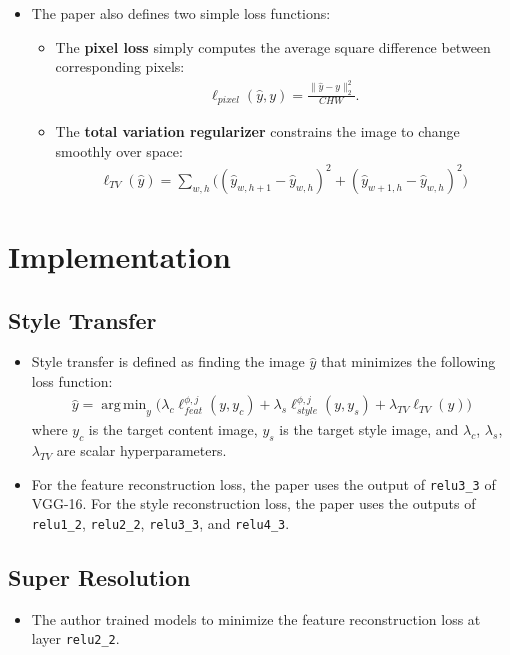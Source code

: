 \documentclass[10pt]{article}
\DeclareMathOperator*{\argmin}{arg\,min}
\begin{document}
\begin{itemize}
    \item The paper also defines two simple loss functions:
    \begin{itemize}
      \item The \textbf{pixel loss} simply computes the average square difference between corresponding pixels:
      \begin{align*}
        \ell_{pixel}(\hat{y}, y) = \frac{\| \hat{y} - y \|_2^2}{CHW}.
      \end{align*}
      \item The \textbf{total variation regularizer} constrains the image to change smoothly over space:
      \begin{align*}
        \ell_{TV}(\hat{y}) = \sum_{w,h} \big( (\hat{y}_{w,h+1} - \hat{y}_{w,h})^2 + (\hat{y}_{w+1,h} - \hat{y}_{w,h})^2 \big)
      \end{align*}
    \end{itemize}
  \end{itemize}

  \section{Implementation}

  \subsection{Style Transfer}

  \begin{itemize}
    \item Style transfer is defined as finding the image $\hat{y}$ that minimizes the following loss function:
    \begin{align*}
      \hat{y} = \argmin_y \big( 
        \lambda_c \ell^{\phi,j}_{feat}(y, y_c)
        + \lambda_s \ell^{\phi,j}_{style}(y, y_s)
        + \lambda_{TV} \ell_{TV}(y) \big)
    \end{align*}
    where $y_c$ is the target content image, $y_s$ is the target style image, and $\lambda_c$, $\lambda_s$, $\lambda_{TV}$ are scalar hyperparameters.

    \item For the feature reconstruction loss, the paper uses the output of \texttt{relu3\_3} of VGG-16. For the style reconstruction loss, the paper uses the outputs of \texttt{relu1\_2}, \texttt{relu2\_2}, \texttt{relu3\_3}, and \texttt{relu4\_3}.
  \end{itemize}

  \subsection{Super Resolution}

  \begin{itemize}
    \item The author trained models to minimize the feature reconstruction loss at layer \texttt{relu2\_2}.
  \end{itemize}

  
    
\end{document}
